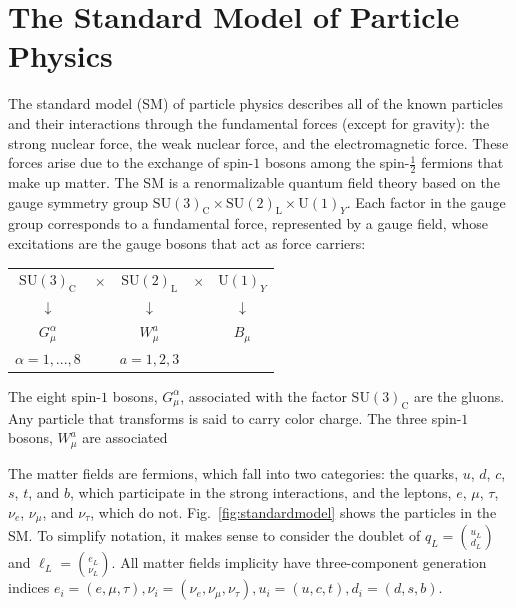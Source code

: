 \section{The Standard Model of Particle Physics}

The standard model (SM) of particle physics describes all of the known
particles and their interactions through the fundamental forces
(except for gravity): the strong nuclear force, the weak nuclear force, and the electromagnetic
force. These forces arise due to the exchange of spin-$1$
bosons among the spin-$\frac{1}{2}$ fermions that make up matter. The SM is a renormalizable quantum field
theory based on the gauge symmetry group $\mathrm{SU(3)}_{\mathrm{C}}\times \mathrm{SU(2)}_{\mathrm{L}}\times
\mathrm{U(1)}_Y$. Each factor in the gauge group corresponds to a fundamental force, represented by a gauge field, whose excitations are
the gauge bosons that act as force carriers:
\begin{center}
\begin{tabular}{ccccc}
$\mathrm{SU(3)}_{\mathrm{C}}$ &$\times$& $\mathrm{SU(2)}_{\mathrm{L}}$
  &$\times$& $\mathrm{U(1)}_Y$\\
 $\downarrow$&&$\downarrow$&&$\downarrow$\\
 $G_{\mu}^{\alpha}$&&$W^a_{\mu}$&&$B_{\mu}$\\
 $\alpha=1,...,8$&&$a=1,2,3$&&
\end{tabular}
\end{center}
The eight spin-$1$ bosons, $G_{\mu}^{\alpha}$,
associated with the factor $\mathrm{SU(3)}_{\mathrm{C}}$ are the gluons. Any
particle that transforms is said to carry color charge. The three spin-$1$
bosons, $W^{a}_{\mu}$ are associated 

The matter fields are fermions, which fall into two
categories: the quarks, $u$, $d$, $c$, $s$, $t$, and $b$, which participate in the
strong interactions, and the leptons, $e$, $\mu$, $\tau$, $\nu_e$,
$\nu_{\mu}$, and $\nu_{\tau}$, which do
not. Fig.~\ref{fig:standardmodel} shows the particles in the SM. To simplify notation, it makes sense to consider the doublet of
$q_L = \binom{u_L}{d_L}$ and $\ell_L = \binom{e_L}{\nu_L}$. All matter fields implicity have
three-component generation indices $e_i=(e,\mu,\tau),
\nu_i=(\nu_e,\nu_{\mu},\nu_{\tau}), u_i=(u,c,t),
d_i=(d,s,b)$. 

